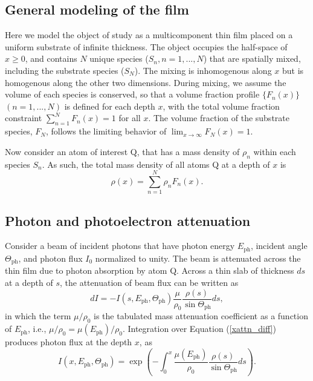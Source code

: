 \documentclass{WileyMSP-template}
\begin{document}
\subsection{General modeling of the film}

Here we model the object of study as a multicomponent thin film placed on a uniform substrate of infinite thickness. The object occupies the half-space of $x\geq0$, and contains $N$ unique species (${S_n}, n = 1,...,N$) that are spatially mixed, including the substrate species ($S_N$). The mixing is inhomogenous along $x$ but is homogenous along the other two dimensions. During mixing, we assume the volume of each species is conserved, so that a volume fraction profile $\{F_n(x)\}$ $(n =1,...,N)$ is defined for each depth $x$, with the total volume fraction constraint $\sum\limits_{n=1}^N F_n(x) = 1$ for all $x$. The volume fraction of the substrate species, $F_N$, follows the limiting behavior of $\lim_{x\to\infty} F_N(x)=1$. 

Now consider an atom of interest Q, that has a mass density of $\rho_n$ within each species $S_n$. As such, the total mass density of all atoms Q at a depth of $x$ is
\begin{equation}
\rho(x) = \displaystyle\sum_{n=1}^N\rho_nF_n(x).
\label{mass_density}
\end{equation}

\subsection{Photon and photoelectron attenuation}

Consider a beam of incident photons that have photon energy $E_\textrm{ph}$, incident angle $\Theta_\textrm{ph}$, and photon flux $I_0$ normalized to unity. The beam is attenuated across the thin film due to photon absorption by atom Q. Across a thin slab of thickness $ds$ at a depth of $s$, the attenuation of beam flux can be written as    
\begin{equation}
dI = -I(s, E_\textrm{ph}, \Theta_\textrm{ph})\frac{\mu}{\rho_0}\frac{\rho(s)}{\sin\Theta_\textrm{ph}}ds,
\label{xattn_diff}
\end{equation}
in which the term $\mu/\rho_0$ is the tabulated mass attenuation coefficient as a function of $E_\textrm{ph}$, i.e., $\mu/\rho_0=\mu(E_\textrm{ph})/\rho_0$. Integration over Equation (\ref{xattn_diff}) produces photon flux at the depth $x$, as
\begin{equation}
I(x, E_\textrm{ph}, \Theta_\textrm{ph}) = \exp\left(-\int_0^x\frac{\mu(E_\textrm{ph})}{\rho_0}\frac{\rho(s)}{\sin\Theta_\textrm{ph}}ds\right).
\label{xattn}
\end{equation}
\end{document}
